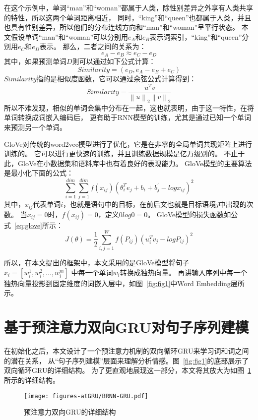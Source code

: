 在这个示例中，单词“man”和“woman”都属于人类，除性别差异之外享有人类共享的特性，所以这两个单词距离相近，
同时，“king”和“queen”也都属于人类，并且也具有性别差异，所以他们的分布连线方向和“man”和“woman”呈平行状态。
本文假设单词“man”和“woman”可以分别用${e_{A}}$和${e_{B}}$表示词索引，“king”和“queen”分别用${e_{C}}$和${e_{D}}$表示。
那么，二者之间的关系为：
\begin{equation}
    e_{A}-e_{B}\approx e_{C}-e_{D}
\end{equation}
其中，如果预测单词${D}$则可以通过如下公式计算：
\begin{equation}
    Similarity=\left( e_{D}, e_{A}-e_{B}+e_{C} \right)
\end{equation}
${Similarity}$指的是相似度函数，它可以通过余弦公式计算得到：
\begin{equation}
    Similarity=\frac{u^{T}v}{\left \| u \right \|_{2}\left \| v \right \|_{2}}
\end{equation}
所以不难发现，相似的单词会集中分布在一起，这也就表明，由于这一特性，在将单词转换成词嵌入编码后，
更有助于RNN模型的训练，尤其是通过已知一个单词来预测另一个单词。

GloVe对传统的word2vec模型进行了优化，它是在非零的全局单词共现矩阵上进行训练的。
它可以进行更快速的训练，并且训练数据规模是亿万级别的。
不止于此，GloVe在小数据集和语料库中也有着良好的表现能力。
GloVe模型的主要算法是最小化下面的公式：
\begin{equation}
    \sum_{i=1}^{dim}\sum_{j=1}^{dim}f\left ( x_{ij} \right )\left ( \theta _{i}^{T}e_{j} +b_{i}+b_{j}^{'}-logx_{ij}\right )^{2}
\end{equation}
其中，${x_{ij}}$代表单词${i}$，也就是语句中的目标，在前后文也就是目标语境${j}$中出现的次数。
当${x_{ij}=0}$时，${f\left ( x_{ij} \right )=0}$，定义${0log0=0}$。
GloVe模型的损失函数如公式~\ref{eq:glove}所示：
\begin{equation}
    J\left ( \theta  \right )=\frac{1}{2}\sum_{i,j=1}^{W}f\left ( P_{ij} \right )\left ( u_{i}^{T}v_{j}-logP_{ij} \right )^{2}
    \label{eq:glove}
\end{equation}

所以，在本文提出的框架中，本文采用的是GloVe模型将句子${x_{i}=\left[w_{i}^{1},w_{i}^{2},...,w_{i}^{m}\right]}$
中每一个单词${w_{i}}$转换成独热向量。
再讲输入序列中每一个独热向量投影到固定维度的词嵌入层中，如图~\ref{fig:fig1}中Word Embedding层所示。

\section{基于预注意力双向GRU对句子序列建模}
在初始化之后，本文设计了一个预注意力机制的双向循环GRU来学习词和词之间的潜在关系，
从“句子序列建模”层面来理解分析情感。图~\ref{fig:fig1}的底部展示了双向循环GRU的详细结构。
为了更直观地展现这一部分，本文将其放大为如图~\ref{fig:BRNN-GRU}所示的详细结构。
\begin{figure}[h!]
    \centering
    \texttt{[image: figures-atGRU/BRNN-GRU.pdf]}
    \caption{预注意力双向GRU的详细结构}
    \label{fig:BRNN-GRU}
\end{figure}

